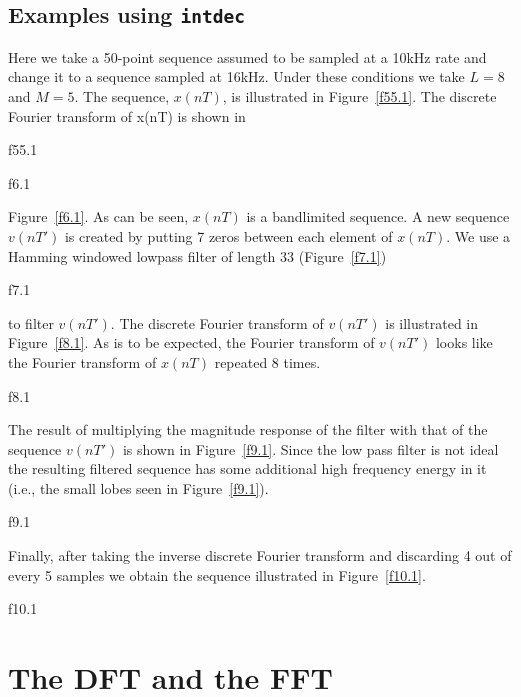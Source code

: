 \subsection{Examples using {\tt intdec}}

	Here we take a 50-point sequence assumed to be sampled at
a 10kHz rate and change it to a sequence sampled at 16kHz.  Under
these conditions we take $L=8$ and $M=5$.
The sequence, $x(nT)$, is illustrated
in Figure~\ref{f55.1}.  The discrete Fourier transform of x(nT) is shown in
%

{f55.1}

%
%

{f6.1}

%
Figure~\ref{f6.1}.  As can be seen, $x(nT)$ is a bandlimited sequence.
A new sequence $v(nT')$ is created by putting 7 zeros 
between each element of $x(nT)$.
We use a Hamming windowed lowpass filter of length 33 (Figure~\ref{f7.1})
%

{f7.1}

%
to filter $v(nT')$.  The discrete Fourier transform of $v(nT')$ is
illustrated in
Figure~\ref{f8.1}.  As is to be expected, the Fourier transform of $v(nT')$
looks like the Fourier transform of $x(nT)$ repeated 8 times.
%

{f8.1}

%
The result of multiplying the magnitude response 
of the filter with that of the
sequence $v(nT')$ is shown in Figure~\ref{f9.1}.  Since the low pass filter
is not ideal the resulting filtered sequence has some additional high frequency
energy in it (i.e., the small lobes seen in Figure~\ref{f9.1}).
%

{f9.1}

%
Finally, after taking the inverse discrete Fourier transform and discarding
4 out of every 5 samples we obtain the sequence illustrated in
Figure~\ref{f10.1}.
%

{f10.1}

%

\section{The DFT and the FFT}

